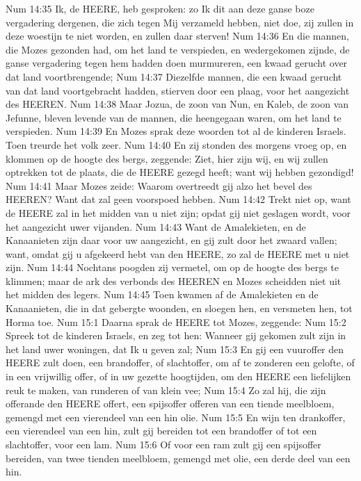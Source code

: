Num 14:35  Ik, de HEERE, heb gesproken: zo Ik dit aan deze ganse boze vergadering dergenen, die zich tegen Mij verzameld hebben, niet doe, zij zullen in deze woestijn te niet worden, en zullen daar sterven!
Num 14:36  En die mannen, die Mozes gezonden had, om het land te verspieden, en wedergekomen zijnde, de ganse vergadering tegen hem hadden doen murmureren, een kwaad gerucht over dat land voortbrengende;
Num 14:37  Diezelfde mannen, die een kwaad gerucht van dat land voortgebracht hadden, stierven door een plaag, voor het aangezicht des HEEREN.
Num 14:38  Maar Jozua, de zoon van Nun, en Kaleb, de zoon van Jefunne, bleven levende van de mannen, die heengegaan waren, om het land te verspieden.
Num 14:39  En Mozes sprak deze woorden tot al de kinderen Israels. Toen treurde het volk zeer.
Num 14:40  En zij stonden des morgens vroeg op, en klommen op de hoogte des bergs, zeggende: Ziet, hier zijn wij, en wij zullen optrekken tot de plaats, die de HEERE gezegd heeft; want wij hebben gezondigd!
Num 14:41  Maar Mozes zeide: Waarom overtreedt gij alzo het bevel des HEEREN? Want dat zal geen voorspoed hebben.
Num 14:42  Trekt niet op, want de HEERE zal in het midden van u niet zijn; opdat gij niet geslagen wordt, voor het aangezicht uwer vijanden.
Num 14:43  Want de Amalekieten, en de Kanaanieten zijn daar voor uw aangezicht, en gij zult door het zwaard vallen; want, omdat gij u afgekeerd hebt van den HEERE, zo zal de HEERE met u niet zijn.
Num 14:44  Nochtans poogden zij vermetel, om op de hoogte des bergs te klimmen; maar de ark des verbonds des HEEREN en Mozes scheidden niet uit het midden des legers.
Num 14:45  Toen kwamen af de Amalekieten en de Kanaanieten, die in dat gebergte woonden, en sloegen hen, en versmeten hen, tot Horma toe.
Num 15:1  Daarna sprak de HEERE tot Mozes, zeggende:
Num 15:2  Spreek tot de kinderen Israels, en zeg tot hen: Wanneer gij gekomen zult zijn in het land uwer woningen, dat Ik u geven zal;
Num 15:3  En gij een vuuroffer den HEERE zult doen, een brandoffer, of slachtoffer, om af te zonderen een gelofte, of in een vrijwillig offer, of in uw gezette hoogtijden, om den HEERE een liefelijken reuk te maken, van runderen of van klein vee;
Num 15:4  Zo zal hij, die zijn offerande den HEERE offert, een spijsoffer offeren van een tiende meelbloem, gemengd met een vierendeel van een hin olie.
Num 15:5  En wijn ten drankoffer, een vierendeel van een hin, zult gij bereiden tot een brandoffer of tot een slachtoffer, voor een lam.
Num 15:6  Of voor een ram zult gij een spijsoffer bereiden, van twee tienden meelbloem, gemengd met olie, een derde deel van een hin.
